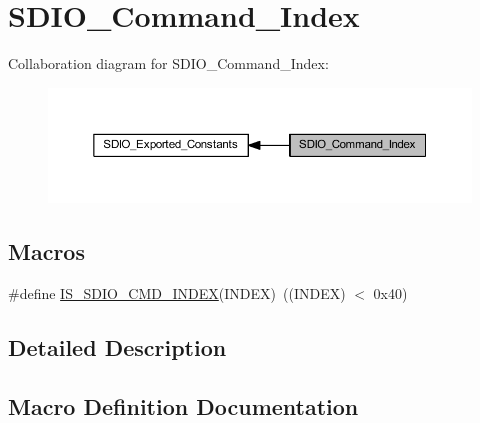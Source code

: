 \hypertarget{group___s_d_i_o___command___index}{}\section{S\+D\+I\+O\+\_\+\+Command\+\_\+\+Index}
\label{group___s_d_i_o___command___index}
Collaboration diagram for S\+D\+I\+O\+\_\+\+Command\+\_\+\+Index\+:
\nopagebreak
\begin{figure}[H]
\begin{center}
\leavevmode
\includegraphics[width=350pt]{group___s_d_i_o___command___index}
\end{center}
\end{figure}
\subsection*{Macros}
\begin{DoxyCompactItemize}
\item 
\#define \hyperlink{group___s_d_i_o___command___index_gae988f9f37c4ebb5f5f9866acb30f2880}{I\+S\+\_\+\+S\+D\+I\+O\+\_\+\+C\+M\+D\+\_\+\+I\+N\+D\+EX}(I\+N\+D\+EX)~((I\+N\+D\+EX) $<$ 0x40)
\end{DoxyCompactItemize}


\subsection{Detailed Description}


\subsection{Macro Definition Documentation}
\mbox{\label{group___s_d_i_o___command___index_gae988f9f37c4ebb5f5f9866acb30f2880}} 
